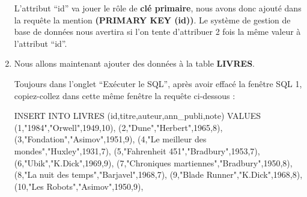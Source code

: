 \documentclass[
  letterpaper,
  DIV=11,
  numbers=noendperiod]{scrartcl}
\newenvironment{Shaded}{\begin{snugshade}}{\end{snugshade}}
\newcommand{\DecValTok}[1]{\textcolor[rgb]{0.68,0.00,0.00}{#1}}
\newcommand{\KeywordTok}[1]{\textcolor[rgb]{0.00,0.23,0.31}{#1}}
\newcommand{\NormalTok}[1]{\textcolor[rgb]{0.00,0.23,0.31}{#1}}
\newcommand{\OtherTok}[1]{\textcolor[rgb]{0.00,0.23,0.31}{#1}}
\begin{document}
\begin{enumerate}
  L'attribut ``id'' va jouer le rôle de \textbf{clé primaire}, nous
  avons donc ajouté dans la requête la mention \textbf{(PRIMARY KEY
  (id))}. Le système de gestion de base de données nous avertira si l'on
  tente d'attribuer 2 fois la même valeur à l'attribut ``id''.
\item
  Nous allons maintenant ajouter des données à la table \textbf{LIVRES}.

  Toujours dans l'onglet ``Exécuter le SQL'', après avoir effacé la
  fenêtre SQL 1, copiez-collez dans cette même fenêtre la requête
  ci-dessous :

\begin{Shaded}
\begin{Highlighting}[]
\KeywordTok{INSERT} \KeywordTok{INTO}\NormalTok{ LIVRES}
\NormalTok{    (}\KeywordTok{id}\NormalTok{,titre,auteur,ann\_publi,note)}
    \KeywordTok{VALUES}
\NormalTok{    (}\DecValTok{1}\NormalTok{,}\OtherTok{"1984"}\NormalTok{,}\OtherTok{"Orwell"}\NormalTok{,}\DecValTok{1949}\NormalTok{,}\DecValTok{10}\NormalTok{),}
\NormalTok{    (}\DecValTok{2}\NormalTok{,}\OtherTok{"Dune"}\NormalTok{,}\OtherTok{"Herbert"}\NormalTok{,}\DecValTok{1965}\NormalTok{,}\DecValTok{8}\NormalTok{),}
\NormalTok{    (}\DecValTok{3}\NormalTok{,}\OtherTok{"Fondation"}\NormalTok{,}\OtherTok{"Asimov"}\NormalTok{,}\DecValTok{1951}\NormalTok{,}\DecValTok{9}\NormalTok{),}
\NormalTok{    (}\DecValTok{4}\NormalTok{,}\OtherTok{"Le meilleur des mondes"}\NormalTok{,}\OtherTok{"Huxley"}\NormalTok{,}\DecValTok{1931}\NormalTok{,}\DecValTok{7}\NormalTok{),}
\NormalTok{    (}\DecValTok{5}\NormalTok{,}\OtherTok{"Fahrenheit 451"}\NormalTok{,}\OtherTok{"Bradbury"}\NormalTok{,}\DecValTok{1953}\NormalTok{,}\DecValTok{7}\NormalTok{),}
\NormalTok{    (}\DecValTok{6}\NormalTok{,}\OtherTok{"Ubik"}\NormalTok{,}\OtherTok{"K.Dick"}\NormalTok{,}\DecValTok{1969}\NormalTok{,}\DecValTok{9}\NormalTok{),}
\NormalTok{    (}\DecValTok{7}\NormalTok{,}\OtherTok{"Chroniques martiennes"}\NormalTok{,}\OtherTok{"Bradbury"}\NormalTok{,}\DecValTok{1950}\NormalTok{,}\DecValTok{8}\NormalTok{),}
\NormalTok{    (}\DecValTok{8}\NormalTok{,}\OtherTok{"La nuit des temps"}\NormalTok{,}\OtherTok{"Barjavel"}\NormalTok{,}\DecValTok{1968}\NormalTok{,}\DecValTok{7}\NormalTok{),}
\NormalTok{    (}\DecValTok{9}\NormalTok{,}\OtherTok{"Blade Runner"}\NormalTok{,}\OtherTok{"K.Dick"}\NormalTok{,}\DecValTok{1968}\NormalTok{,}\DecValTok{8}\NormalTok{),}
\NormalTok{    (}\DecValTok{10}\NormalTok{,}\OtherTok{"Les Robots"}\NormalTok{,}\OtherTok{"Asimov"}\NormalTok{,}\DecValTok{1950}\NormalTok{,}\DecValTok{9}\NormalTok{),}

\end{Highlighting}
\end{Shaded}
\end{enumerate}
\end{document}
